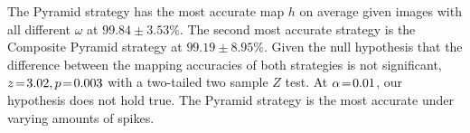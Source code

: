 The Pyramid strategy has the most accurate map $h$ on average given images with all different $\omega$ at $99.84\!\pm\!3.53\%$.
The second most accurate strategy is the Composite Pyramid strategy at $99.19\!\pm\!8.95\%$.
Given the null hypothesis that the difference between the mapping accuracies of both strategies is not significant, $z \!=\! 3.02, p \!=\! 0.003$ with a two-tailed two sample $Z$ test.
At $\alpha \!=\! 0.01$, our hypothesis does not hold true.
The Pyramid strategy is the most accurate under varying amounts of spikes.
